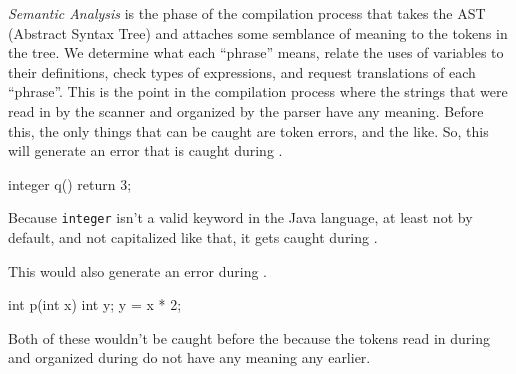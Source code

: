 \begin{definition}\label{def:Semantic Analysis}
  \emph{Semantic Analysis} is the phase of the compilation process that takes the AST (Abstract Syntax Tree) and attaches some semblance of meaning to the tokens in the tree.
  We determine what each ``phrase'' means, relate the uses of variables to their definitions, check types of expressions, and request translations of each ``phrase''.
  This is the point in the compilation process where the strings that were read in by the scanner and organized by the parser have any meaning. Before this, the only things that can be caught are token errors, and the like.
  So, this will generate an error that is caught during .
  \begin{javasource}
    integer q() {
      return 3;
    }
  \end{javasource}
  Because \verb|integer| isn't a valid keyword in the Java language, at least not by default, and not capitalized like that, it gets caught during .

  This would also generate an error during .
  \begin{javasource}
    int p(int x) {
      int y;
      y = x * 2;
    }
  \end{javasource}

  Both of these wouldn't be caught before the  because the tokens read in during  and organized during  do not have any meaning any earlier.
\end{definition}
